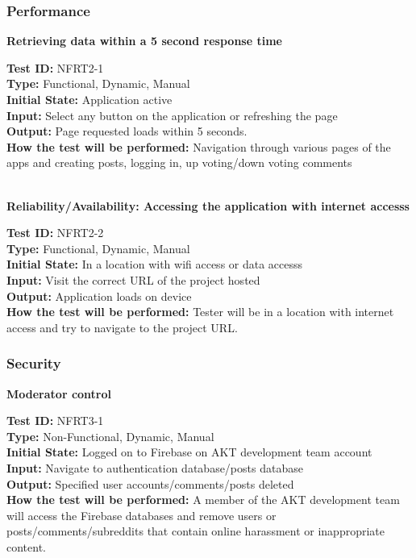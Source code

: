 \documentclass[12pt,fleqn]{article}
\begin{document}
\subsubsection{Performance}

\textbf{Retrieving data within a 5 second response time}
\begin{tcolorbox}
\textbf{Test ID:} NFRT2-1\\ 
\textbf{Type:} Functional, Dynamic, Manual\\
\textbf{Initial State:} Application active \\
\textbf{Input:} Select any button on the application or refreshing the page\\
\textbf{Output:} Page requested loads within 5 seconds. \\
\textbf{How the test will be performed:} Navigation through various pages of the apps and creating posts, logging in, up voting/down voting comments
\end {tcolorbox}

\textbf{\\Reliability/Availability: Accessing the application with internet accesss }
\begin{tcolorbox}
\textbf{Test ID:} NFRT2-2\\ 
\textbf{Type:} Functional, Dynamic, Manual\\
\textbf{Initial State:} In a location with wifi access or data accesss \\
\textbf{Input:} Visit the correct URL of the project hosted\\
\textbf{Output:} Application loads on device \\
\textbf{How the test will be performed:} Tester will be in a location with internet access and try to navigate to the project URL.
\end {tcolorbox}


\subsubsection{Security}
		
\textbf{Moderator control}
\begin{tcolorbox}
\textbf{Test ID:} NFRT3-1\\
\textbf{Type:} Non-Functional, Dynamic, Manual\\
\textbf{Initial State:} Logged on to Firebase on AKT development team account \\
\textbf{Input:} Navigate to authentication database/posts database \\
\textbf{Output:} Specified user accounts/comments/posts deleted\\
\textbf{How the test will be performed:} A member of the AKT development team will access the Firebase databases and remove users or posts/comments/subreddits that contain online harassment or inappropriate content.
\end{tcolorbox}
\end{document}
